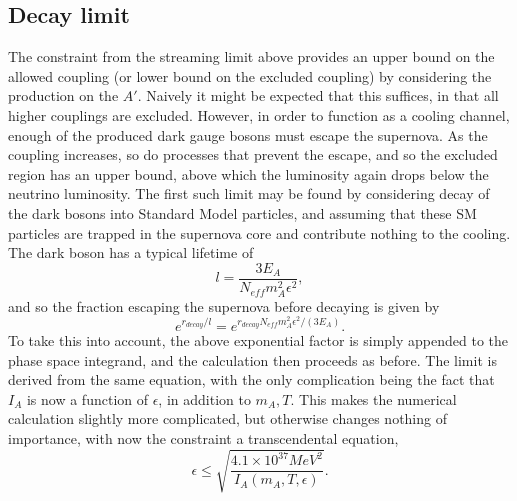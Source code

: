 \documentclass[nofootinbib,prd,superscriptaddress,twocolumn]{revtex4}
\newcommand{\beq}{\begin{equation}}
\newcommand{\eeq}{\end{equation}}
\begin{document}
\subsection{Decay limit}
The constraint from the streaming limit above provides an upper bound on the allowed coupling (or lower bound on the excluded coupling) by considering the production on the $A'$. Naively it might be expected that this suffices, in that all higher couplings are excluded. However, in order to function as a cooling channel, enough of the produced dark gauge bosons must escape the supernova. As the coupling increases, so do processes that prevent the escape, and so the excluded region has an upper bound, above which the luminosity again drops below the neutrino luminosity. The first such limit may be found by considering decay of the dark bosons into Standard Model particles, and assuming that these SM particles are trapped in the supernova core and contribute nothing to the cooling. The dark boson has a typical lifetime of 
\beq
l = \frac{3 E_{A}}{N_{eff} m_A^2 \epsilon^2},
\eeq
and so the fraction escaping the supernova before decaying is given by 
\beq
e^{r_{decay}/l} = e^{r_{decay} N_{eff} m_A^2 \epsilon^2/(3 E_A)}.
\eeq
To take this into account, the above exponential factor is simply appended to the phase space integrand, and the calculation then proceeds as before. The limit is derived from the same equation, with the only complication being the fact that $ I_A $ is now a function of $ \epsilon $, in addition to $ m_A, T $. This makes the numerical calculation slightly more complicated, but otherwise changes nothing of importance, with now the constraint a transcendental equation,  
\beq
\epsilon \le \sqrt{\frac{4.1 \times 10^{37} MeV^2}{I_A(m_A, T, \epsilon)}}.
\eeq
	
	
\end{document}
